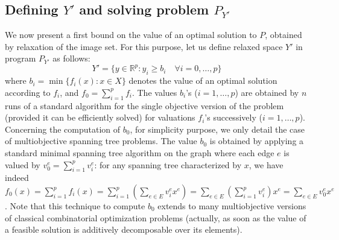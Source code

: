 \documentclass[final,3p,times]{elsarticle}
\newcommand{\RP}{\mathbb{R}^p}
\begin{document}
\subsection{Defining $Y'$ and solving problem $P_{Y'}$}

We now present a first bound on the value of an optimal solution to
$P$, obtained by relaxation of the image set. For this purpose,
let us define relaxed space $Y'$ in program $P_{Y'}$ as follows: 
$$
Y'=\{y \in \RP:y_i \geq b_i \quad \forall i=0,\ldots,p\}
$$
where $b_i = \min\{f_i(x):x \in X\}$ denotes the value of an optimal solution
according to $f_i$, and $f_0 = \sum_{i=1}^p f_i$. The values $b_i$'s
($i = 1, \ldots, p$) are obtained by $n$ runs of a standard algorithm
for the single objective version of the problem (provided it can be efficiently solved) for valuations $f_i$'s successively ($i = 1, \ldots,
p$). Concerning the computation of $b_0$, for simplicity purpose, we
only detail the case of multiobjective spanning tree problems. The
value $b_0$ is obtained by applying a standard minimal spanning tree
algorithm on the graph where each edge $e$ is valued by $v_0^e =
\sum_{i=1}^p v_i^e$: for any spanning tree characterized by $x$, we have indeed $f_0(x) = \sum_{i=1}^p f_i(x) =
\sum_{i=1}^p (\sum_{e \in E} v_i^e x^e) = \sum_{e \in E} (\sum_{i=1}^p
v_i^e) x^e = \sum_{e \in E} v_0^e x^e$. Note that this technique to compute
$b_0$ extends to many multiobjective versions of classical
combinatorial optimization problems (actually, as soon as the value of
a feasible solution is additively decomposable over its elements). 
\end{document}

